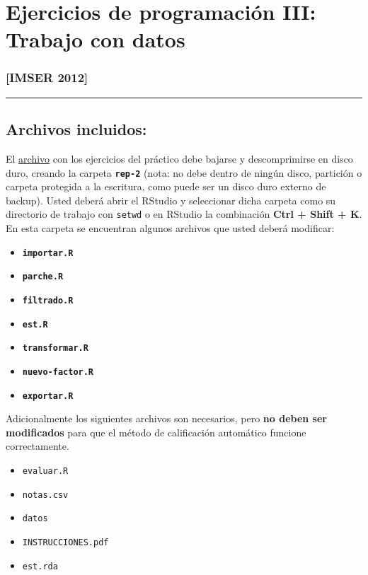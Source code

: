 \documentclass[]{article}
\begin{document}
\section{Ejercicios de programación III: Trabajo con datos}

\subsubsection{{[}IMSER 2012{]}}

\begin{center}\rule{3in}{0.4pt}\end{center}

\subsection{Archivos incluidos:}

El
\href{http://eva.universidad.edu.uy/file.php/1454/ejercicios\_de\_programacion/rep-1.zip}{archivo}
con los ejercicios del práctico debe bajarse y descomprimirse en disco
duro, creando la carpeta \textbf{\texttt{rep-2}} (nota: no debe dentro
de ningún disco, partición o carpeta protegida a la escritura, como
puede ser un disco duro externo de backup). Usted deberá abrir el
RStudio y seleccionar dicha carpeta como su directorio de trabajo con
\texttt{setwd} o en RStudio la combinación \textbf{Ctrl + Shift + K}. En
esta carpeta se encuentran algunos archivos que usted deberá modificar:

\begin{itemize}
\item
  \textbf{\texttt{importar.R}}
\item
  \textbf{\texttt{parche.R}}
\item
  \textbf{\texttt{filtrado.R}}
\item
  \textbf{\texttt{est.R}}
\item
  \textbf{\texttt{transformar.R}}
\item
  \textbf{\texttt{nuevo-factor.R}}
\item
  \textbf{\texttt{exportar.R}}
\end{itemize}
Adicionalmente los siguientes archivos son necesarios, pero \textbf{no
deben ser modificados} para que el método de calificación automático
funcione correctamente.

\begin{itemize}
\item
  \texttt{evaluar.R}
\item
  \texttt{notas.csv}
\item
  \texttt{datos}
\item
  \texttt{INSTRUCCIONES.pdf}
\item
  \texttt{est.rda}
\end{itemize}
\end{document}

